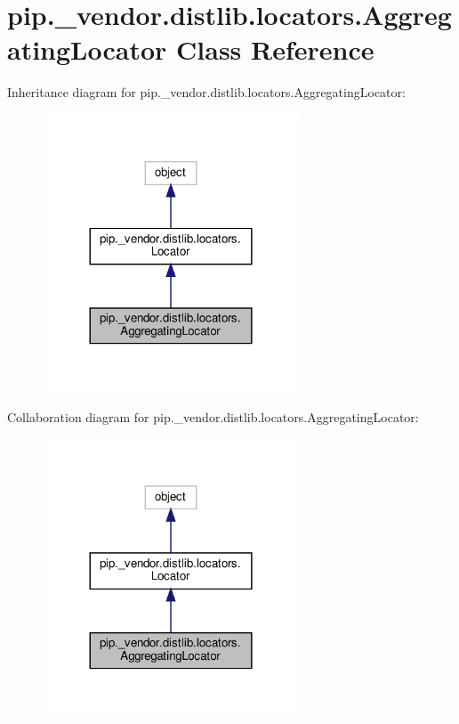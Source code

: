 \hypertarget{classpip_1_1__vendor_1_1distlib_1_1locators_1_1AggregatingLocator}{}\section{pip.\+\_\+vendor.\+distlib.\+locators.\+Aggregating\+Locator Class Reference}
\label{classpip_1_1__vendor_1_1distlib_1_1locators_1_1AggregatingLocator}


Inheritance diagram for pip.\+\_\+vendor.\+distlib.\+locators.\+Aggregating\+Locator\+:
\nopagebreak
\begin{figure}[H]
\begin{center}
\leavevmode
\includegraphics[width=216pt]{classpip_1_1__vendor_1_1distlib_1_1locators_1_1AggregatingLocator__inherit__graph}
\end{center}
\end{figure}


Collaboration diagram for pip.\+\_\+vendor.\+distlib.\+locators.\+Aggregating\+Locator\+:
\nopagebreak
\begin{figure}[H]
\begin{center}
\leavevmode
\includegraphics[width=216pt]{classpip_1_1__vendor_1_1distlib_1_1locators_1_1AggregatingLocator__coll__graph}
\end{center}
\end{figure}
